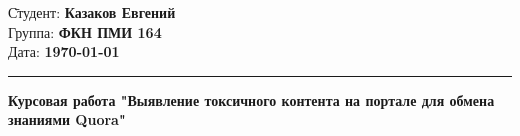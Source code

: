 
\begin{tabbing}
	\hspace{13cm} \= Студент: \= \textbf{Казаков Евгений} \\
	\> Группа: \> \textbf{ФКН ПМИ 164} \\
	\> Дата: \> \textbf{\today}
\end{tabbing}
\hrule
\vspace{1cm}

\begin{center}
	\begin{Large}
		\textbf{
			Курсовая работа "Выявление токсичного контента на портале для обмена знаниями Quora"
		}
	\end{Large}
\end{center}

\vspace{1cm}

